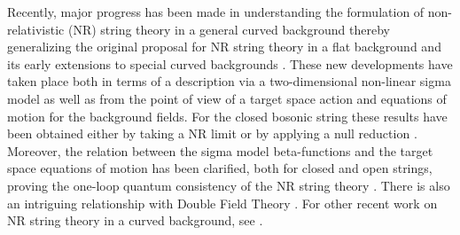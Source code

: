 \documentclass[a4paper,10pt,openany]{article}
\begin{document}
	Recently, major progress has been made in understanding the formulation of non-relativistic (NR) string theory in a general curved background thereby generalizing the original proposal for NR string theory in a flat background \cite{Gomis:2000bd,Danielsson:2000gi} and its early extensions to special curved backgrounds \cite{Gomis:2005pg}. These new developments have taken place both in terms of a description via a two-dimensional non-linear sigma model as well as from the point of view of   a target space action and equations of motion for the background fields. For the closed bosonic string these results have been obtained either by  taking a NR limit \cite{Bergshoeff:2018yvt,Bergshoeff:2019pij,Bergshoeff:2021bmc,Bidussi:2021ujm} or by applying a null reduction \cite{Harmark:2017rpg,Harmark:2018cdl,Harmark:2019upf,Bidussi:2021ujm}.
	Moreover, the relation between the sigma model beta-functions and the target space equations of motion has been clarified, both  for closed and open strings,  proving the one-loop quantum consistency of the NR string theory \cite{Gomis:2019zyu,Yan:2019xsf,Gomis:2020fui,Gomis:2020izd,Gallegos:2019icg}.
	There is also an intriguing relationship with Double Field Theory \cite{Gallegos:2020egk,Cho:2019ofr,Ko:2015rha,Morand:2017fnv,Blair:2020gng, Park:2020ixf}. For other  recent work on NR string theory in a curved background, see \cite{Kluson:2018egd,Kluson:2018vfd,Kluson:2019ifd,Roychowdhury:2019qmp,Hartong:2021ekg}.
	
\end{document}
